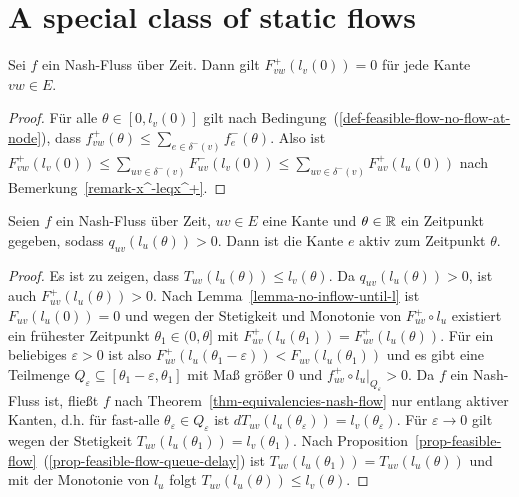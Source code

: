 
\section{A special class of static flows}

\begin{lemma}\label{lemma-no-inflow-until-l}
	Sei $f$ ein Nash-Fluss über Zeit.
	Dann gilt $F_{vw}^+(l_v(0)) = 0$ für jede Kante $vw\in E$.
\end{lemma}
\begin{proof}
	Für alle $\theta\in [0, l_v(0)]$ gilt nach Bedingung~(\ref{def-feasible-flow-no-flow-at-node}), dass $f_{vw}^+(\theta) \leq \sum_{e\in\delta^-(v)} f_e^-(\theta)$.
	Also ist $F_{vw}^+(l_v(0)) \leq \sum_{uv\in\delta^-(v)} F_{uv}^-(l_v(0))\leq \sum_{uv\in\delta^-(v)} F_{uv}^+(l_u(0))$ nach Bemerkung~\ref{remark-x^-leqx^+}.
\end{proof}

\begin{lemma}\label{lemma-nash-flow-waiting-queue-implies-active-edge}
	Seien $f$ ein Nash-Fluss über Zeit, $uv\in E$ eine Kante und $\theta\in\mathbb{R}$ ein Zeitpunkt gegeben, sodass $q_{uv}(l_u(\theta)) > 0$.
	Dann ist die Kante $e$ aktiv zum Zeitpunkt $\theta$.
\end{lemma}
\begin{proof}
	Es ist zu zeigen, dass $T_{uv}(l_u(\theta)) \leq l_v(\theta)$.
	Da $q_{uv}(l_u(\theta)) > 0$, ist auch $F^+_{uv}(l_u(\theta)) > 0$.
	Nach Lemma~\ref{lemma-no-inflow-until-l} ist $F_{uv}(l_u(0))=0$ und wegen der Stetigkeit und Monotonie von $F_{uv}^+\circ l_u$ existiert
	ein frühester Zeitpunkt $\theta_1\in (0, \theta]$ mit $F_{uv}^+(l_u(\theta_1)) = F_{uv}^+(l_u(\theta))$.
	Für ein beliebiges $\varepsilon>0$ ist also $F_{uv}^+(l_u(\theta_1-\varepsilon)) < F_{uv}(l_u(\theta_1))$ und es gibt eine Teilmenge $Q_\varepsilon \subseteq [\theta_1 - \varepsilon, \theta_1]$ mit Maß größer 0 und $f_{uv}^+\circ l_u\big|_{Q_\varepsilon} > 0$.
	Da $f$ ein Nash-Fluss ist, fließt $f$ nach Theorem~\ref{thm-equivalencies-nash-flow} nur entlang aktiver Kanten, d.h. für fast-alle $\theta_\varepsilon\in Q_\varepsilon$ ist $dT_{uv}(l_u(\theta_\varepsilon))=l_v(\theta_\varepsilon)$.
	Für $\varepsilon\rightarrow0$ gilt wegen der Stetigkeit $T_{uv}(l_u(\theta_1))=l_v(\theta_1)$.
	Nach Proposition~\ref{prop-feasible-flow}~(\ref{prop-feasible-flow-queue-delay}) ist $T_{uv}(l_u(\theta_1)) = T_{uv}(l_u(\theta))$ und mit der Monotonie von $l_u$ folgt $T_{uv}(l_u(\theta))\leq l_v(\theta)$.
\end{proof}

